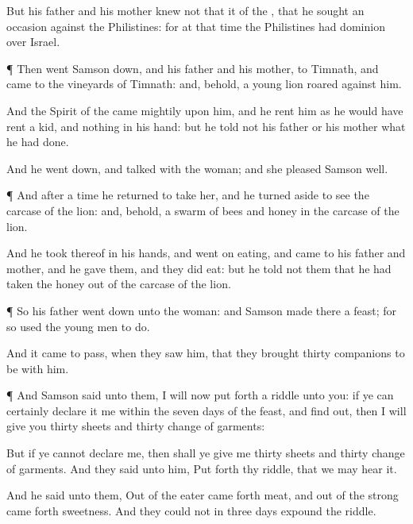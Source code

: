 {But his
father and his
mother
knew not that it
{} of the
{}, that he
sought an
occasion against the
Philistines: for at that
time the
Philistines had
dominion over
Israel.


\par }{\PP {}¶ Then
went
Samson
down, and his
father and his
mother, to
Timnath, and
came to the
vineyards of
Timnath: and, behold, a
young
lion
roared
against him.

And the
Spirit of the
{} came
mightily upon him, and he
rent him as he would have
rent a
kid, and
{}
nothing in his
hand: but he
told not his
father or his
mother what he had
done.

And he went
down, and
talked with the
woman; and she
pleased
Samson
well.


\par }{\PP {}¶ And after a
time he
returned to
take her, and he turned
aside to
see the
carcase of the
lion: and, behold,
{} a
swarm of
bees and
honey in the
carcase of the
lion.

And he
took thereof in his
hands, and went
on
eating, and
came to his
father and
mother, and he
gave them, and they did
eat: but he
told not them that he had
taken the
honey out of the
carcase of the
lion.


\par }{\PP {}¶ So his
father went
down unto the
woman: and
Samson
made there a
feast; for so used the young
men to
do.

And it came to pass, when they
saw him, that they
brought
thirty
companions to be with him.


\par }{\PP {}¶ And
Samson
said unto them, I will now put
forth a
riddle unto you: if ye can
certainly
declare it me within the
seven
days of the
feast, and find
{}
out, then I will
give you
thirty
sheets and
thirty
change of
garments:

But if ye
cannot
declare
{} me, then shall ye
give me
thirty
sheets and
thirty
change of
garments. And they
said unto him, Put
forth thy
riddle, that we may
hear it.

And he
said unto them, Out of the
eater came
forth
meat, and out of the
strong came
forth
sweetness. And they
could not in
three
days
expound the
riddle.

}
